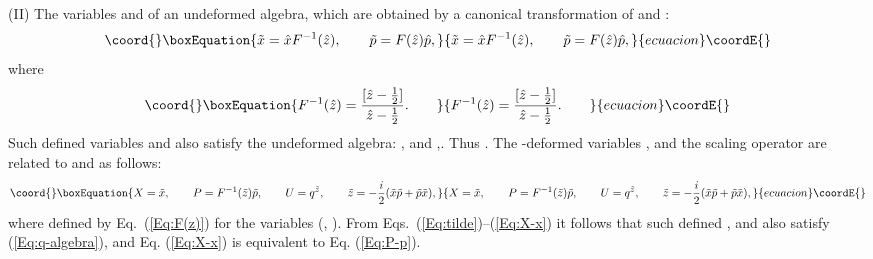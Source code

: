 \documentclass[a4paper,12pt]{article}
\providecommand{\half}{{\textstyle\frac{1}{2}}}
\begin{document}
(II) The variables \coordHE{} and \coordHE{} of an undeformed algebra, 
which are obtained by a canonical transformation 
of \coordHE{} and \coordHE{}:
\begin{equation}\coord{}\boxEquation{
\label{Eq:tilde}
\tilde x=\hat x F^{-1}(\hat z), \qquad \tilde p= F(\hat z)\hat p,
}{
\tilde x=\hat x F^{-1}(\hat z), \qquad \tilde p= F(\hat z)\hat p,
}{ecuacion}\coordE{}\end{equation}
where 
\begin{equation}\coord{}\boxEquation{
\label{Eq:F(z)}
F^{-1}(\hat z)= \frac{[\hat z-\half]}{\hat z-\half}. \qquad
}{
F^{-1}(\hat z)= \frac{[\hat z-\half]}{\hat z-\half}. \qquad
}{ecuacion}\coordE{}\end{equation}
Such defined variables \coordHE{} and \coordHE{} also satisfy the undeformed 
algebra: \coordHE{}, and 
\coordHE{},\quad{}\coordHE{}.
Thus \coordHE{}.
The \coordHE{}-deformed variables \coordHE{}, \coordHE{} and 
the scaling operator \coordHE{} are related to  \coordHE{} and \coordHE{} as follows:
\begin{equation}\coord{}\boxEquation{
\label{Eq:X-x}
X=\tilde x, \qquad P=F^{-1}(\tilde z) \tilde p, \qquad
U= q^{\tilde z}, \qquad  \tilde z=-\frac{i}{2}(\tilde x\tilde p + 
\tilde p\tilde x),
}{
X=\tilde x, \qquad P=F^{-1}(\tilde z) \tilde p, \qquad
U= q^{\tilde z}, \qquad  \tilde z=-\frac{i}{2}(\tilde x\tilde p + 
\tilde p\tilde x),
}{ecuacion}\coordE{}\end{equation}
where \coordHE{} defined by Eq.~(\ref{Eq:F(z)}) for the variables  
(\coordHE{}, \coordHE{}).
From Eqs.~(\ref{Eq:tilde})--(\ref{Eq:X-x}) it follows that such defined \coordHE{},
\coordHE{} and \coordHE{} also satisfy (\ref{Eq:q-algebra}), and Eq. (\ref{Eq:X-x})  is 
equivalent to Eq. (\ref{Eq:P-p}).
\end{document}
